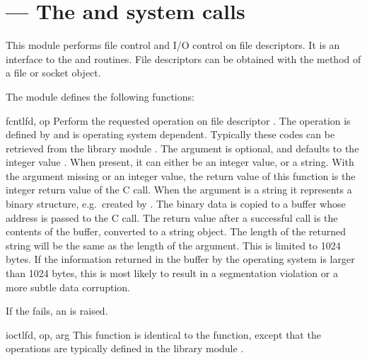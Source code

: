 \section{ ---
         The  and  system calls}



This module performs file control and I/O control on file descriptors.
It is an interface to the  and 
\UNIX{} routines.  File descriptors can be obtained with the
 method of a file or socket object.

The module defines the following functions:


\begin{funcdesc}{fcntl}{fd, op}
  Perform the requested operation on file descriptor .
  The operation is defined by  and is operating system
  dependent.  Typically these codes can be retrieved from the library
  module . The argument 
  is optional, and defaults to the integer value .  When
  present, it can either be an integer value, or a string.  With
  the argument missing or an integer value, the return value of this
  function is the integer return value of the C 
  call.  When the argument is a string it represents a binary
  structure, e.g.\ created by . The binary
  data is copied to a buffer whose address is passed to the C
   call.  The return value after a successful call
  is the contents of the buffer, converted to a string object.  The length
  of the returned string will be the same as the length of the  
  argument.  This is limited to 1024 bytes.  If the information returned
  in the buffer by the operating system is larger than 1024 bytes, 
  this is most likely to result in a segmentation violation or a more
  subtle data corruption.

  If the  fails, an  is
  raised.
\end{funcdesc}

\begin{funcdesc}{ioctl}{fd, op, arg}
  This function is identical to the  function, except
  that the operations are typically defined in the library module
  .
\end{funcdesc}

